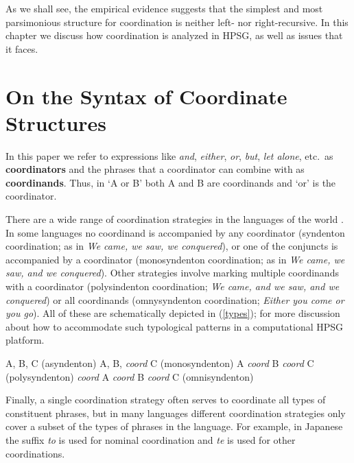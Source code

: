 \documentclass[output=paper
                ,modfonts
                ,nonflat
	        ,collection
	        ,collectionchapter
	        ,collectiontoclongg
 	        ,biblatex
                ,babelshorthands
                ,newtxmath
                ,draftmode
                ,colorlinks, citecolor=brown
]{./langsci/langscibook}
\begin{document}
\noindent
As we shall see, the empirical evidence suggests that
the simplest and most parsimonious structure for coordination is neither left- nor right-recursive.
In this chapter we discuss how coordination is analyzed in HPSG, as well as issues that it faces.

\section{On the Syntax of Coordinate Structures}

In this paper we refer to expressions like \emph{and}, \emph{either},  \emph{or}, \emph{but}, 
\emph{let alone}, etc.\ as \textbf{coordinators} and the phrases that a coordinator can combine with as  \textbf{coordinands}.
Thus,  in `A or B' both A and B are coordinands and `or' is the coordinator. 

There are a wide range of coordination strategies in the languages of the world \citet{haspelmath}. In some languages no coordinand is accompanied by any coordinator (syndenton coordination; as in \emph{We came, we saw, we conquered}), or one of the conjuncts is accompanied by a coordinator (monosyndenton coordination; as in \emph{We came, we saw, and we conquered}). Other strategies involve marking multiple coordinands with a coordinator (polysindenton coordination;
\emph{We came, and we saw, and we conquered}) or all coordinands (omnysyndenton coordination;
\emph{Either you come or you go}).
All of these are schematically depicted in (\ref{types});
 \citet{Drellishak:Bender:05} for more discussion about how to accommodate such typological patterns in a computational HPSG platform.

\begin{exe}
\ex
\begin{xlista}
\ex A, B, C \hfill (asyndenton)
\ex A, B, \emph{coord} C \hfill (monosyndenton)
\ex A \emph{coord} B \emph{coord} C \hfill (polysyndenton)
\ex \emph{coord} A \emph{coord} B \emph{coord} C \hfill (omnisyndenton)
\end{xlista}\label{types}
\end{exe}



\noindent
 Finally, a single coordination strategy often serves to coordinate all types of constituent phrases, but in many languages different coordination strategies only cover a subset of the types of phrases in the language. For example, in
Japanese the suffix \emph{to} is used for nominal coordination
and \emph{te} is used for other coordinations.
\end{document}
